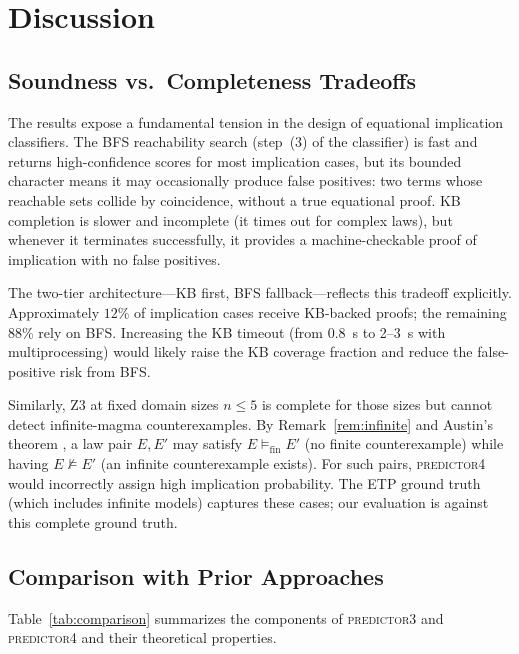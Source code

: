 \section{Discussion}
\label{sec:discussion}

\subsection{Soundness vs.\ Completeness Tradeoffs}

The results expose a fundamental tension in the design of equational implication
classifiers.  The BFS reachability search (step~(3) of the classifier)
is fast and returns high-confidence scores for most implication cases, but its
bounded character means it may occasionally produce false positives: two terms whose
reachable sets collide by coincidence, without a true equational proof.  KB completion
is slower and incomplete (it times out for complex laws), but whenever it terminates
successfully, it provides a machine-checkable proof of implication with no false
positives.

The two-tier architecture---KB first, BFS fallback---reflects this tradeoff explicitly.
Approximately $12\%$ of implication cases receive KB-backed proofs; the remaining $88\%$
rely on BFS.  Increasing the KB timeout (from 0.8~s to 2--3~s with multiprocessing)
would likely raise the KB coverage fraction and reduce the false-positive risk from BFS.

Similarly, Z3 at fixed domain sizes $n \leq 5$ is complete for those sizes but cannot
detect infinite-magma counterexamples.  By Remark~\ref{rem:infinite} and Austin's
theorem \cite{austin1979equational}, a law pair $E, E'$ may satisfy $E \models_\mathrm{fin} E'$
(no finite counterexample) while having $E \not\models E'$ (an infinite counterexample
exists).  For such pairs, \textsc{predictor4} would incorrectly assign high implication
probability.  The ETP ground truth (which includes infinite models) captures these cases;
our evaluation is against this complete ground truth.

\subsection{Comparison with Prior Approaches}

Table~\ref{tab:comparison} summarizes the components of \textsc{predictor3} and
\textsc{predictor4} and their theoretical properties.

